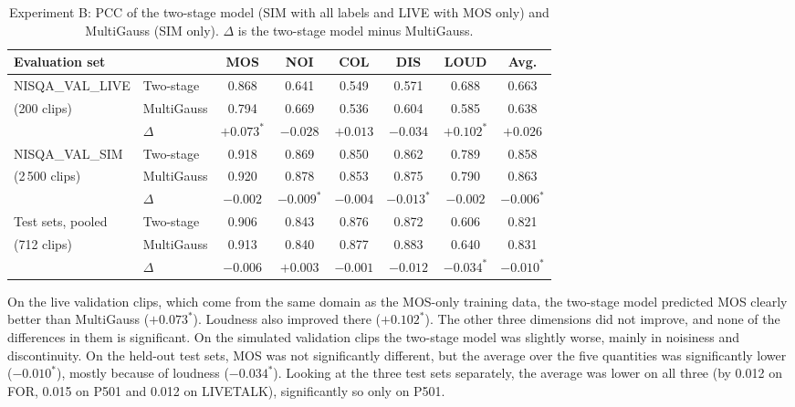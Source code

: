 \documentclass[
english,                 %
bibtex,                  %
includeExtraAbstracts, %
]{kththesis}
\numberwithin{listing}{chapter}
\begin{document}
\begin{table}[!ht]
  \centering
  \caption{Experiment B: PCC of the two-stage model (SIM with all labels and LIVE with MOS only) and MultiGauss (SIM only). $\Delta$ is the two-stage model minus MultiGauss.}
  \label{tab:expB}
  \setlength{\tabcolsep}{4pt}
  \begin{adjustbox}{max width=\textwidth}
  \begin{tabular}{llcccccc}
    \toprule
    Evaluation set & & MOS & NOI & COL & DIS & LOUD & Avg. \\
    \midrule
    NISQA\_VAL\_LIVE & Two-stage & 0.868 & 0.641 & 0.549 & 0.571 & 0.688 & 0.663 \\
    (200 clips)      & MultiGauss & 0.794 & 0.669 & 0.536 & 0.604 & 0.585 & 0.638 \\
                     & $\Delta$ & $+0.073^{*}$ & $-0.028$ & $+0.013$ & $-0.034$ & $+0.102^{*}$ & $+0.026$ \\
    \midrule
    NISQA\_VAL\_SIM  & Two-stage & 0.918 & 0.869 & 0.850 & 0.862 & 0.789 & 0.858 \\
    (2\,500 clips)   & MultiGauss & 0.920 & 0.878 & 0.853 & 0.875 & 0.790 & 0.863 \\
                     & $\Delta$ & $-0.002$ & $-0.009^{*}$ & $-0.004$ & $-0.013^{*}$ & $-0.002$ & $-0.006^{*}$ \\
    \midrule
    Test sets, pooled & Two-stage & 0.906 & 0.843 & 0.876 & 0.872 & 0.606 & 0.821 \\
    (712 clips)       & MultiGauss & 0.913 & 0.840 & 0.877 & 0.883 & 0.640 & 0.831 \\
                      & $\Delta$ & $-0.006$ & $+0.003$ & $-0.001$ & $-0.012$ & $-0.034^{*}$ & $-0.010^{*}$ \\
    \bottomrule
  \end{tabular}
  \end{adjustbox}
\end{table}

On the live validation clips, which come from the same domain as the MOS-only training data, the two-stage model predicted MOS clearly better than MultiGauss ($+0.073^{*}$). Loudness also improved there ($+0.102^{*}$). The other three dimensions did not improve, and none of the differences in them is significant. On the simulated validation clips the two-stage model was slightly worse, mainly in noisiness and discontinuity. On the held-out test sets, MOS was not significantly different, but the average over the five quantities was significantly lower ($-0.010^{*}$), mostly because of loudness ($-0.034^{*}$). Looking at the three test sets separately, the average was lower on all three (by 0.012 on FOR, 0.015 on P501 and 0.012 on LIVETALK), significantly so only on P501.
\end{document}
